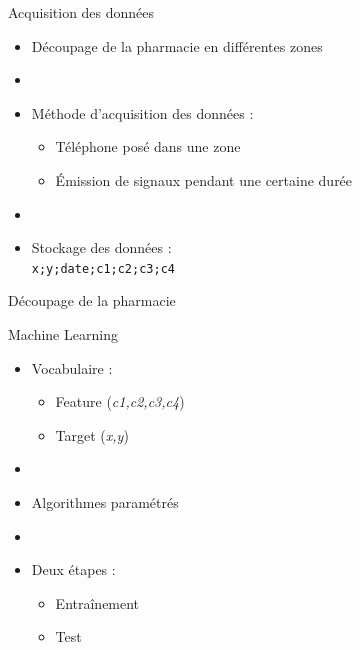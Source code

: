 \documentclass{beamer}
\begin{document}
\begin{frame}{Acquisition des données}
  \begin{itemize}
    \item Découpage de la pharmacie en différentes zones
    \item[]
    \item Méthode d'acquisition des données :
    \begin{itemize}
      \item Téléphone posé dans une zone
      \item \'Emission de signaux pendant une certaine durée
    \end{itemize}
    \item[]
    \item Stockage des données :\\
    \texttt{x;y;date;c1;c2;c3;c4}
  \end{itemize}
\end{frame}

\begin{frame}{Découpage de la pharmacie}
  \begin{center}
  \end{center}
\end{frame}

\begin{frame}{Machine Learning}
  \begin{itemize}
    \item Vocabulaire :
    \begin{itemize}
      \item Feature (\textit{c1,c2,c3,c4})
      \item Target (\textit{x,y})
    \end{itemize}
    \item[]
    \item Algorithmes paramétrés
    \item[]
    \item Deux étapes :
    \begin{itemize}
      \item Entraînement
      \item Test
    \end{itemize}
  \end{itemize}
\end{frame}
\end{document}

